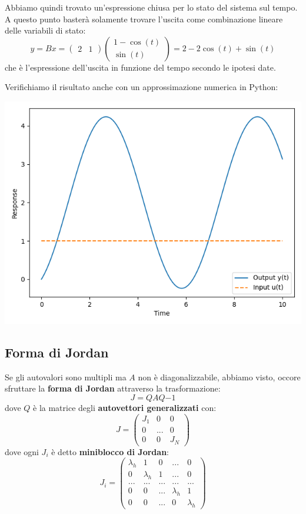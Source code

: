 \documentclass[a4paper,11pt]{article}
\begin{document}
Abbiamo quindi trovato un'espressione chiusa per lo stato del sistema sul tempo.
A questo punto basterà solamente trovare l'uscita come combinazione lineare delle variabili di stato:
$$
y = Bx = \begin{pmatrix}
	2 & 1
\end{pmatrix}
\begin{pmatrix}
1 - \cos(t) \\ 
\sin(t)
\end{pmatrix}
=
2 - 2\cos(t) + \sin(t)
$$
che è l'espressione dell'uscita in funzione del tempo secondo le ipotesi date.

Verifichiamo il risultato anche con un approssimazione numerica in Python:

\begin{center}
\includegraphics[scale=0.65]{../figures/first-degree-input-diffeq.png}
\end{center}

\subsection{Forma di Jordan}
Se gli autovalori sono multipli ma $A$ non è diagonalizzabile, abbiamo visto, occore sfruttare la \textbf{forma di Jordan} attraverso la trasformazione:
$$
J = Q A Q{-1}
$$
dove $Q$ è la matrice degli \textbf{autovettori generalizzati} con:
$$
J = \begin{pmatrix}
	J_1 & 0 & 0 \\
	0 & ... & 0 \\
	0 & 0 & J_N
\end{pmatrix}
$$
dove ogni $J_i$ è detto \textbf{miniblocco di Jordan}:
$$
J_i = \begin{pmatrix}
	\lambda_h & 1 & 0 & ... & 0 \\ 
	0 & \lambda_h & 1 & ... & 0 \\ 
	... & ... & ... & ... & ... \\ 
	0 & 0 & ... & \lambda_h & 1 \\
	0 & 0 & ... & 0 & \lambda_h
\end{pmatrix}
$$
\end{document}
